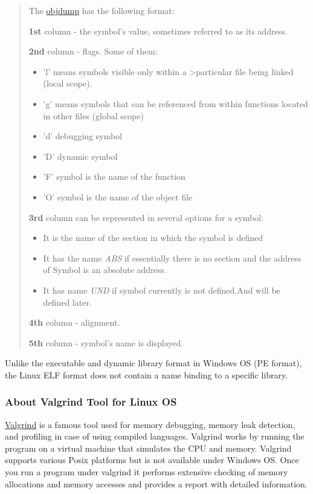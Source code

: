 \documentclass[
]{article}
\begin{document}
\begin{quote}
The \href{https://man7.org/linux/man-pages/man1/objdump.1.html}{objdump}
has the following format:

\textbf{1st} column - the symbol's value, sometimes referred to as its
address.

\textbf{2nd} column - flags. Some of them:

\begin{itemize}
\item
  'l' means symbols visible only within a \textgreater particular file
  being linked (local scope).
\item
  'g' means symbols that can be referenced from within functions located
  in other files (global scope)
\item
  'd' debugging symbol
\item
  'D' dynamic symbol
\item
  'F' symbol is the name of the function
\item
  'O' symbol is the name of the object file
\end{itemize}

\textbf{3rd} column can be represented in several options for a symbol:

\begin{itemize}
\item
  It is the name of the section in which the symbol is defined
\item
  It has the name \emph{ABS} if essentially there is no section and the
  address of Symbol is an absolute address.
\item
  It has name \emph{UND} if symbol currently is not defined.And will be
  defined later.
\end{itemize}

\textbf{4th} column - alignment.

\textbf{5th} column - symbol's name is displayed.
\end{quote}

Unlike the executable and dynamic library format in Windows OS (PE
format), the Linux ELF format does not contain a name binding to a
specific library.

\hypertarget{about-valgrind-tool-for-linux-os}{%
\subsubsection{About Valgrind Tool for Linux
OS}\label{about-valgrind-tool-for-linux-os}}

\href{https://valgrind.org/}{Valgrind} is a famous tool used for memory
debugging, memory leak detection, and profiling in case of using
compiled languages. Valgrind works by running the program on a virtual
machine that simulates the CPU and memory. Valgrind supports various
Posix platforms but is not available under Windows OS. Once you run a
program under valgrind it performs extensive checking of memory
allocations and memory accesses and provides a report with detailed
information.
\end{document}
